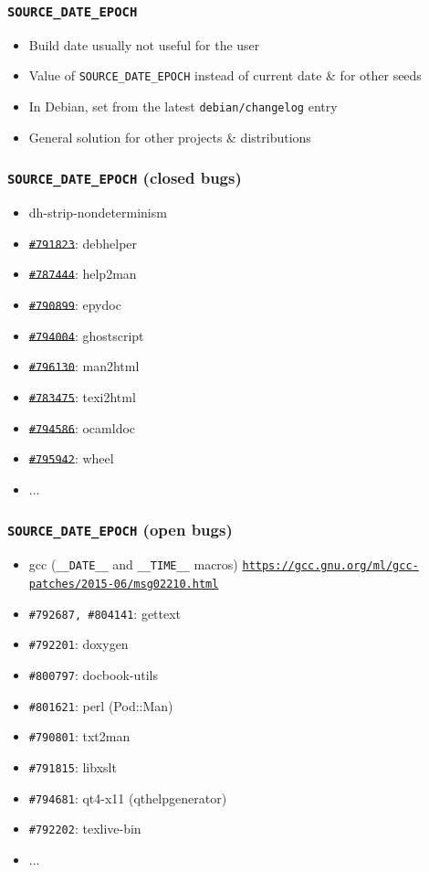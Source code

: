 \documentclass[14pt]{beamer}
\begin{document}
\begin{frame}
 \frametitle{\texttt{SOURCE\_DATE\_EPOCH}}

 \begin{itemize}
  \item Build date usually not useful for the user
  \item Value of \texttt{SOURCE\_DATE\_EPOCH} instead of current date \& for other seeds
  \item In Debian, set from the latest \texttt{debian/changelog} entry
  \item General solution for other projects \& distributions
 \end{itemize}
\end{frame}

\begin{frame}
 \frametitle{\texttt{SOURCE\_DATE\_EPOCH} (closed bugs)}

 \begin{itemize}
  \item dh-strip-nondeterminism
  \item \sout{\texttt{\#791823}}: debhelper
  \item \sout{\texttt{\#787444}}: help2man
  \item \sout{\texttt{\#790899}}: epydoc
  \item \sout{\texttt{\#794004}}: ghostscript
  \item \sout{\texttt{\#796130}}: man2html
  \item \sout{\texttt{\#783475}}: texi2html
  \item \sout{\texttt{\#794586}}: ocamldoc
  \item \sout{\texttt{\#795942}}: wheel
  \item ...
 \end{itemize}
\end{frame}


\begin{frame}
 \frametitle{\texttt{SOURCE\_DATE\_EPOCH} (open bugs)}

 \begin{itemize}
  \item gcc (\texttt{\_\_DATE\_\_} and \texttt{\_\_TIME\_\_} macros) \texttt{\footnotesize{\url{https://gcc.gnu.org/ml/gcc-patches/2015-06/msg02210.html}}}
  \item \texttt{\#792687, \#804141}: gettext
  \item \texttt{\#792201}: doxygen
  \item \texttt{\#800797}: docbook-utils
  \item \texttt{\#801621}: perl (Pod::Man)
  \item \texttt{\#790801}: txt2man
  \item \texttt{\#791815}: libxslt
  \item \texttt{\#794681}: qt4-x11 (qthelpgenerator)
  \item \texttt{\#792202}: texlive-bin
  \item ...
 \end{itemize}

\end{frame}
\end{document}
